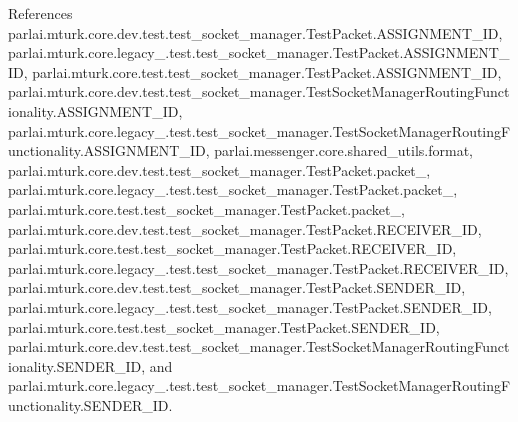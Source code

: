 References parlai.\+mturk.\+core.\+dev.\+test.\+test\+\_\+socket\+\_\+manager.\+Test\+Packet.\+A\+S\+S\+I\+G\+N\+M\+E\+N\+T\+\_\+\+ID, parlai.\+mturk.\+core.\+legacy\+\_.\+test.\+test\+\_\+socket\+\_\+manager.\+Test\+Packet.\+A\+S\+S\+I\+G\+N\+M\+E\+N\+T\+\_\+\+ID, parlai.\+mturk.\+core.\+test.\+test\+\_\+socket\+\_\+manager.\+Test\+Packet.\+A\+S\+S\+I\+G\+N\+M\+E\+N\+T\+\_\+\+ID, parlai.\+mturk.\+core.\+dev.\+test.\+test\+\_\+socket\+\_\+manager.\+Test\+Socket\+Manager\+Routing\+Functionality.\+A\+S\+S\+I\+G\+N\+M\+E\+N\+T\+\_\+\+ID, parlai.\+mturk.\+core.\+legacy\+\_.\+test.\+test\+\_\+socket\+\_\+manager.\+Test\+Socket\+Manager\+Routing\+Functionality.\+A\+S\+S\+I\+G\+N\+M\+E\+N\+T\+\_\+\+ID, parlai.\+messenger.\+core.\+shared\+\_\+utils.\+format, parlai.\+mturk.\+core.\+dev.\+test.\+test\+\_\+socket\+\_\+manager.\+Test\+Packet.\+packet\+\_, parlai.\+mturk.\+core.\+legacy\+\_.\+test.\+test\+\_\+socket\+\_\+manager.\+Test\+Packet.\+packet\+\_, parlai.\+mturk.\+core.\+test.\+test\+\_\+socket\+\_\+manager.\+Test\+Packet.\+packet\+\_, parlai.\+mturk.\+core.\+dev.\+test.\+test\+\_\+socket\+\_\+manager.\+Test\+Packet.\+R\+E\+C\+E\+I\+V\+E\+R\+\_\+\+ID, parlai.\+mturk.\+core.\+test.\+test\+\_\+socket\+\_\+manager.\+Test\+Packet.\+R\+E\+C\+E\+I\+V\+E\+R\+\_\+\+ID, parlai.\+mturk.\+core.\+legacy\+\_.\+test.\+test\+\_\+socket\+\_\+manager.\+Test\+Packet.\+R\+E\+C\+E\+I\+V\+E\+R\+\_\+\+ID, parlai.\+mturk.\+core.\+dev.\+test.\+test\+\_\+socket\+\_\+manager.\+Test\+Packet.\+S\+E\+N\+D\+E\+R\+\_\+\+ID, parlai.\+mturk.\+core.\+legacy\+\_.\+test.\+test\+\_\+socket\+\_\+manager.\+Test\+Packet.\+S\+E\+N\+D\+E\+R\+\_\+\+ID, parlai.\+mturk.\+core.\+test.\+test\+\_\+socket\+\_\+manager.\+Test\+Packet.\+S\+E\+N\+D\+E\+R\+\_\+\+ID, parlai.\+mturk.\+core.\+dev.\+test.\+test\+\_\+socket\+\_\+manager.\+Test\+Socket\+Manager\+Routing\+Functionality.\+S\+E\+N\+D\+E\+R\+\_\+\+ID, and parlai.\+mturk.\+core.\+legacy\+\_.\+test.\+test\+\_\+socket\+\_\+manager.\+Test\+Socket\+Manager\+Routing\+Functionality.\+S\+E\+N\+D\+E\+R\+\_\+\+ID.

\mbox{\label{classparlai_1_1mturk_1_1core_1_1test_1_1test__socket__manager_1_1TestPacket_a49fabdabfedeeeb7f76a9a3ad513a954}} 
